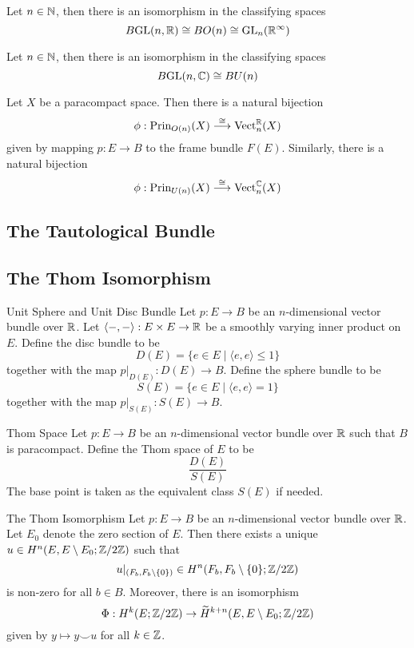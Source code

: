 \documentclass[a4paper]{article}
\begin{document}
\begin{thm}{}{} Let $n\in\mathbb{N}$, then there is an isomorphism in the classifying spaces $$B\text{GL}(n,\mathbb{R})\cong BO(n)\cong\text{GL}_n(\mathbb{R}^\infty)$$
\end{thm}

\begin{thm}{}{} Let $n\in\mathbb{N}$, then there is an isomorphism in the classifying spaces $$B\text{GL}(n,\mathbb{C})\cong BU(n)$$
\end{thm}

\begin{thm}{}{} Let $X$ be a paracompact space. Then there is a natural bijection $$\phi:\text{Prin}_{O(n)}(X)\overset{\cong}{\longrightarrow}\text{Vect}_n^{\mathbb{R}}(X)$$ given by mapping $p:E\to B$ to the frame bundle $F(E)$. Similarly, there is a natural bijection $$\phi:\text{Prin}_{U(n)}(X)\overset{\cong}{\longrightarrow}\text{Vect}_n^{\mathbb{C}}(X)$$
\end{thm}

\subsection{The Tautological Bundle}

\subsection{The Thom Isomorphism}
\begin{defn}{Unit Sphere and Unit Disc Bundle}{} Let $p:E\to B$ be an $n$-dimensional vector bundle over $\mathbb{R}$. Let $\langle-,-\rangle:E\times E\to\mathbb{R}$ be a smoothly varying inner product on $E$. Define the disc bundle to be $$D(E)=\{e\in E\;|\;\langle e,e\rangle\leq 1\}$$ together with the map $p|_{D(E)}:D(E)\to B$. Define the sphere bundle to be $$S(E)=\{e\in E\;|\;\langle e,e\rangle=1\}$$ together with the map $p|_{S(E)}:S(E)\to B$. 
\end{defn}

\begin{defn}{Thom Space}{} Let $p:E\to B$ be an $n$-dimensional vector bundle over $\mathbb{R}$ such that $B$ is paracompact. Define the Thom space of $E$ to be $$\frac{D(E)}{S(E)}$$ The base point is taken as the equivalent class $S(E)$ if needed. 
\end{defn}

\begin{thm}{The Thom Isomorphism}{} Let $p:E\to B$ be an $n$-dimensional vector bundle over $\mathbb{R}$. Let $E_0$ denote the zero section of $E$. Then there exists a unique $u\in H^n(E,E\setminus E_0;\mathbb{Z}/2\mathbb{Z})$ such that $$u|_{(F_b,F_b\setminus\{0\})}\in H^n(F_b,F_b\setminus\{0\};\mathbb{Z}/2\mathbb{Z})$$ is non-zero for all $b\in B$. Moreover, there is an isomorphism $$\Phi:H^k(E;\mathbb{Z}/2\mathbb{Z})\to\widetilde{H}^{k+n}(E,E\setminus E_0;\mathbb{Z}/2\mathbb{Z})$$ given by $y\mapsto y\smile u$ for all $k\in\mathbb{Z}$. 
\end{thm}
\end{document}
